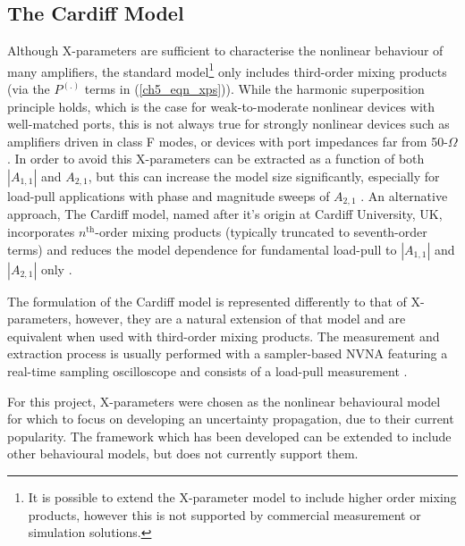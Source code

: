 \documentclass[../thesis/thesis.tex]{subfiles}
\begin{document}
\subsection{The Cardiff Model}

Although X-parameters are sufficient to characterise the nonlinear behaviour of many amplifiers, the standard model\footnote{It is possible to extend the X-parameter model to include higher order mixing products, however this is not supported by commercial measurement or simulation solutions.} only includes third-order mixing products (via the $P^{(.)}$ terms in (\ref{ch5_eqn_xps})). While the harmonic superposition principle holds, which is the case for weak-to-moderate nonlinear devices with well-matched ports, this is not always true for strongly nonlinear devices such as amplifiers driven in class F modes, or devices with port impedances far from 50-$\Omega$. In order to avoid this X-parameters can be extracted as a function of both $|A_{1,1}|$ and $A_{2,1}$, but this can increase the model size significantly, especially for load-pull applications with phase and magnitude sweeps of $A_{2,1}$ \cite{Gunyan_2009}. An alternative approach,  The Cardiff model, named after it's origin at Cardiff University, UK, incorporates $n^{\textrm{th}}$-order mixing products (typically truncated to seventh-order terms) and reduces the model dependence for fundamental load-pull to $|A_{1,1}|$ and $|A_{2,1}|$ only \cite{Woodington_2008,Qi_2009}.

The formulation of the Cardiff model is represented differently to that of X-parameters, however, they are a natural extension of that model and are equivalent when used with third-order mixing products. The measurement and extraction process is usually performed with a sampler-based NVNA featuring a real-time sampling oscilloscope and consists of a load-pull measurement \cite{Woodington_2010}.

For this project, X-parameters were chosen as the nonlinear behavioural model for which to focus on developing an uncertainty propagation, due to their current popularity. The framework which has been developed can be extended to include other behavioural models, but does not currently support them.
\end{document}
